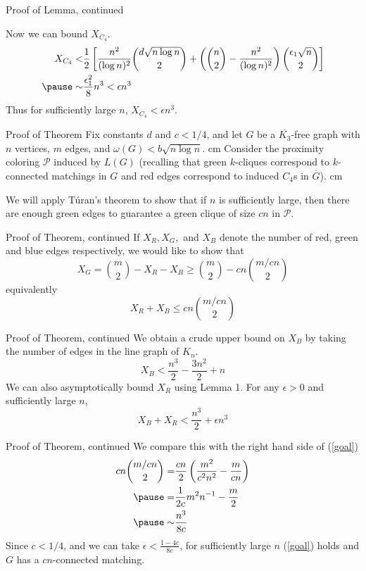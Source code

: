 \documentclass{beamer}
\newcommand{\bframe}[2]{\begin{frame}{#1}#2\end{frame}}
\begin{document}
\bframe{Proof of Lemma, continued}{

Now we can bound $X_{C_4}$.\pause
\begin{eqnarray*}X_{C_4} <& \frac{1}{2}\left[\frac{n^2}{(\log n)^2}{d\sqrt{n\log n}\choose 2}+ \left( {n\choose 2}- \frac{n^2}{(\log n)^2}\right){\epsilon_1\sqrt{n}\choose 2}\right]\\\pause
\sim& \frac{\epsilon_1^2}{8}n^3 < \epsilon n^3
\end{eqnarray*}
Thus for sufficiently large $n$, $X_{C_4} < \epsilon n^3$.
}

\bframe{Proof of Theorem}{
\pause
Fix constants $d$ and $c < 1/4$, and let $G$ be a $\overline{K_3}$-free graph with $n$ vertices, $m$ edges, and $\omega(G) < b\sqrt{n\log n}$. \pause \vskip 0.5 cm
Consider the proximity coloring $\mathcal{P}$ induced by $L(G)$ (recalling that green $k$-cliques correspond to $k$-connected matchings in $G$ and red edges correspond to induced $C_4$s in $\overline{G}$). \pause \vskip 0.5 cm

We will apply T\'{u}ran's theorem to show that if $n$ is sufficiently large, then there are enough green edges to guarantee a green clique of size $cn$ in $\mathcal{P}$.

}

\bframe{Proof of Theorem, continued}{
 If $X_R, X_G,$ and $X_B$ denote the number of red, green and blue edges respectively, we would like to show that \[X_G = {m\choose 2} - X_R - X_B \geq {m\choose 2} - cn{m/cn\choose 2}\] \pause 
equivalently \pause
\begin{equation}
	X_R + X_B \leq cn{m/cn\choose 2}\label{goal}
\end{equation}
}

\bframe{Proof of Theorem, continued}{
We obtain a crude upper bound on $X_B$ by taking the number of edges in the line graph of $K_n$. \pause
\begin{equation}
	X_B < \frac{n^3}{2} - \frac{3n^2}{2} + n
\end{equation}\pause
We can also asymptotically bound $X_R$ using Lemma 1.  \pause For any $\epsilon > 0$ and sufficiently large $n$,\pause  \[X_B + X_R < \frac{n^3}{2} + \epsilon n^3\]
}

\bframe{Proof of Theorem, continued}{
We compare this with the right hand side of (\ref{goal})\pause
\begin{eqnarray}
	cn{m/cn\choose 2} =&\displaystyle \frac{cn}{2}\left(\frac{m^2}{c^2n^2} - \frac{m}{cn}\right)\\ \pause
	=& \displaystyle \frac{1}{2c}m^2n^{-1} - \frac{m}{2}\\ \pause
	\sim&   \displaystyle \frac{n^3}{8c}
\end{eqnarray}
Since $c < 1/4$, and we can take $\epsilon < \frac{1-4c}{8c}$, for sufficiently large $n$ (\ref{goal}) holds and $G$ has a $cn$-connected matching.
}
\end{document}
